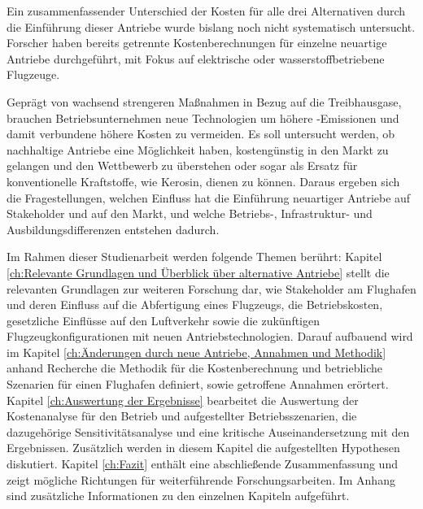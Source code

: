Ein zusammenfassender Unterschied der Kosten für alle drei Alternativen durch die Einführung dieser Antriebe 
wurde bislang noch nicht systematisch untersucht. 
Forscher haben bereits getrennte Kostenberechnungen für einzelne neuartige Antriebe durchgeführt, mit Fokus auf
elektrische oder wasserstoffbetriebene Flugzeuge. 

Geprägt von wachsend strengeren Maßnahmen in Bezug auf die Treibhausgase, brauchen Betriebsunternehmen neue Technologien um
höhere -Emissionen und damit verbundene höhere Kosten zu vermeiden.
Es soll untersucht werden, ob nachhaltige Antriebe eine Möglichkeit haben, 
kostengünstig in den Markt zu gelangen und den Wettbewerb zu überstehen oder 
sogar als Ersatz für konventionelle Kraftstoffe, wie Kerosin, dienen zu können. 
Daraus ergeben sich die Fragestellungen, welchen Einfluss hat die Einführung neuartiger Antriebe 
auf Stakeholder und auf den Markt, und welche Betriebs-, Infrastruktur- und Ausbildungsdifferenzen entstehen dadurch.

Im Rahmen dieser Studienarbeit werden folgende Themen berührt:
Kapitel \ref{ch:Relevante Grundlagen und Überblick über alternative Antriebe} stellt 
die relevanten Grundlagen zur weiteren Forschung dar, wie Stakeholder am Flughafen und 
deren Einfluss auf die Abfertigung eines Flugzeugs, die Betriebskosten, 
gesetzliche Einflüsse auf den Luftverkehr sowie die zukünftigen Flugzeugkonfigurationen 
mit neuen Antriebstechnologien.
Darauf aufbauend wird im Kapitel \ref{ch:Änderungen durch neue Antriebe, Annahmen und Methodik} 
anhand Recherche die Methodik für die Kostenberechnung und betriebliche Szenarien für einen Flughafen definiert, 
sowie getroffene Annahmen erörtert.
Kapitel \ref{ch:Auswertung der Ergebnisse} bearbeitet die Auswertung der Kostenanalyse 
für den Betrieb und aufgestellter Betriebsszenarien, die dazugehörige Sensitivitätsanalyse und
eine kritische Auseinandersetzung mit den Ergebnissen. 
Zusätzlich werden in diesem Kapitel die aufgestellten Hypothesen diskutiert.
Kapitel \ref{ch:Fazit} enthält eine abschließende Zusammenfassung 
und zeigt mögliche Richtungen für weiterführende Forschungsarbeiten.
Im Anhang sind zusätzliche Informationen zu den einzelnen Kapiteln aufgeführt.
